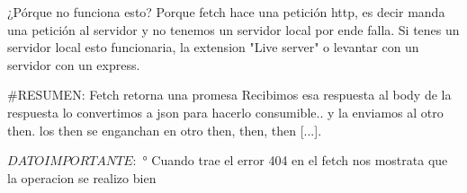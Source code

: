 ¿Pórque no funciona esto?
Porque fetch hace una petición http, es decir manda una petición al servidor y no tenemos un servidor local por ende falla.
Si tenes un servidor local esto funcionaria, la extension "Live server" o levantar con un servidor con un express.




#RESUMEN: 
Fetch retorna una promesa
Recibimos esa respuesta
al body de la respuesta lo convertimos a json para hacerlo consumible..
y la enviamos al otro then. 
los then se enganchan en otro then, then, then [...].

$DATO IMPORTANTE:$
° Cuando  trae el error 404  en el fetch nos mostrata que la operacion se realizo bien
